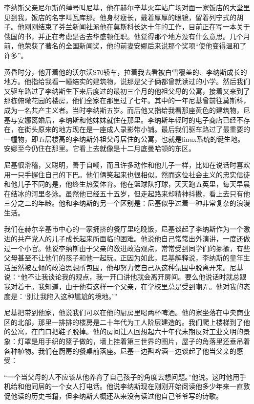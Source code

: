 李纳斯父亲尼尔斯的绰号叫尼基，他在赫尔辛基火车站广场对面一家饭店的大堂里见到我，饭店的名字叫瓦库那。他身材瘦长，戴着厚厚的眼镜，留着列宁式的胡子。他刚刚结束了芬兰新闻社派他在莫斯科长达十年的工作，目前正在写一本关于俄国的书，并正在考虑是否去华盛顿任职。他觉得那个地方没有什么意思。几个月前，他荣获了著名的全国新闻奖，他的前妻安娜后来说那个奖项“使他变得温和了许多”。

黄昏时分，他开着他的沃尔沃S70轿车，拉着我去看被白雪覆盖的、李纳斯成长的地方。他指给我看一幢结实的建筑物，说那是父子俩都曾就读过的小学。然后我们又驱车路过了李纳斯生下来后度过的最初三个月的他祖父母的公寓，接着又来到了那栋俯瞰花园的楼房，他们全家在那里过了七年。其中的一年尼基曾前往莫斯科，成为一名共产主义者。当时李纳斯五岁。而后他又指给我看那座黄色的建筑物，尼基与安娜离婚后，李纳斯和他妹妹就住在那里。李纳斯年轻时的电子商店已经不存在，在街头原来的地方现在是一座成人录影带小铺。最后我们驱车路过了最重要的一幢物，即五层楼高的李纳斯外祖父母居住的公寓，也就是linux系统的诞生地。安娜至今仍住在那里。它看上去就像是十二月底曼哈顿的东区。

尼基很滑稽，又聪明，善于自嘲，而且许多动作和他儿子一样，比如在说话时喜欢用一只手握住自己的下巴。他们俩笑起来也很相似。然而这位社会主义的忠实信徒和他儿子不同的是，他终生热爱体育。他在篮球队打球，天天跑五英里，每天早晨在结冰的河里冬泳。虽然他已经五十五岁，但走起路来却精神抖擞，看上去只有他三分之二的年龄。他和李纳斯的另一个区别是：尼基似乎过着一种非常复杂的浪漫生活。

我们在赫尔辛基市中心的一家拥挤的餐厅里吃晚饭，尼基谈起了李纳斯作为一个激进的共产党人的儿子成长起来所面临的困难。他说他自己常常出外演讲，一度还做过一个小官。他说李纳斯由于父亲的激进政治观点，常常受到同学们的挪揄，有些父母甚至不让他们的孩子和他一起玩。正因为如此，尼基解释说，李纳斯的童年生活虽然被左倾的政治思想所包围，他却努力使自己从这种氛围中脱离开来。尼基说：“他不让我谈论我的观点，我一开口讲他就会离开房间。要么他说话时就总跟我对着干。我知道，由于他有这样一个父亲，在学校里总是受到嘲弄。他对我的态度是：‘别让我陷入这种尴尬的境地。’”

尼基把带到他家，他说我们可以在他的厨房里喝两杯啤酒。他的家坐落在中央商业区的北部，那里一排排的楼房是二十年代为工人阶层建造的。我们爬上楼梯到了他的公寓，在门口把鞋子脱掉。他的房间让人回想起六十年代末期反对工业文明的景象：灯罩是用手织的篮子做的，墙上挂着第三世界的图片，屋子的角落里还垂吊着各种植物。我们在厨房的餐桌前落座。尼基一边斟啤酒一边谈起了他当父亲的感受：

“一个当父母的人不应该从他养育了自己孩子的角度去想问题。”他说。这时他用手机给和他同居的一个女人打电话。他说李纳斯现在刚刚开始阅读他多少年来一直敦促他读的历史书籍，但李纳斯大概还从来没有读过他自己爷爷写的诗歌。

